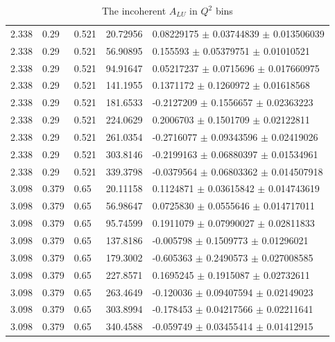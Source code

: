 \begin{table}[!h]
\begin{center}
\begin{tabular}{||l|l|l|l|l||}
  2.338 & 0.29 & 0.521  &    20.72956  &  0.08229175 $\pm$  0.03744839  $\pm$  0.013506039    \\ 
  2.338 & 0.29 & 0.521  &    56.90895  &  0.155593   $\pm$  0.05379751  $\pm$  0.01010521     \\ 
  2.338 & 0.29 & 0.521  &    94.91647  &  0.05217237 $\pm$  0.0715696   $\pm$  0.017660975    \\ 
  2.338 & 0.29 & 0.521  &    141.1955  &  0.1371172  $\pm$  0.1260972   $\pm$  0.01618568     \\ 
  2.338 & 0.29 & 0.521  &    181.6533  &  -0.2127209 $\pm$  0.1556657   $\pm$  0.02363223     \\ 
  2.338 & 0.29 & 0.521  &    224.0629  &  0.2006703  $\pm$  0.1501709   $\pm$  0.02122811     \\ 
  2.338 & 0.29 & 0.521  &    261.0354  &  -0.2716077 $\pm$  0.09343596  $\pm$  0.02419026     \\ 
  2.338 & 0.29 & 0.521  &    303.8146  &  -0.2199163 $\pm$  0.06880397  $\pm$  0.01534961     \\ 
  2.338 & 0.29 & 0.521  &    339.3798  &  -0.0379564 $\pm$  0.06803362  $\pm$  0.014507918    \\ 
 \hline
                                                                      
  3.098 &0.379 & 0.65  &     20.11158  &  0.1124871  $\pm$  0.03615842  $\pm$  0.014743619    \\ 
  3.098 &0.379 & 0.65  &     56.98647  &  0.0725830  $\pm$  0.0555646   $\pm$  0.014717011    \\ 
  3.098 &0.379 & 0.65  &     95.74599  &  0.1911079  $\pm$  0.07990027  $\pm$  0.02811833     \\ 
  3.098 &0.379 & 0.65  &     137.8186  &  -0.005798  $\pm$  0.1509773   $\pm$  0.01296021     \\ 
  3.098 &0.379 & 0.65  &     179.3002  &  -0.605363  $\pm$  0.2490573   $\pm$  0.027008585    \\ 
  3.098 &0.379 & 0.65  &     227.8571  &  0.1695245  $\pm$  0.1915087   $\pm$  0.02732611     \\ 
  3.098 &0.379 & 0.65  &     263.4649  &  -0.120036  $\pm$  0.09407594  $\pm$  0.02149023     \\ 
  3.098 &0.379 & 0.65  &     303.8994  &  -0.178453  $\pm$  0.04217566  $\pm$  0.02211641     \\ 
  3.098 &0.379 & 0.65  &     340.4588  &  -0.059749  $\pm$  0.03455414  $\pm$  
 0.01412915     \\ \hline
 \hline
      \end{tabular}
      \caption{The incoherent $A_{LU}$ in $Q^2$ bins}
      \label{table:InCoh_Q2_BSA}
   \end{center}
\end{table}


